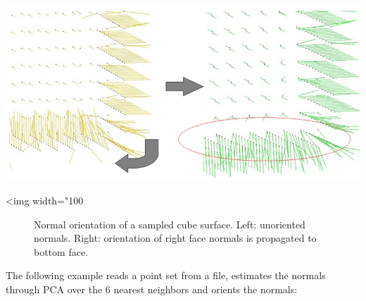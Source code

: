 \begin{center}
    \begin{ccTexOnly}
        \includegraphics[width=1.0\textwidth]{Point_set_processing_3/mst_orient_normals} %
    \end{ccTexOnly}
    \begin{ccHtmlOnly}
        <img width="100%
    \end{ccHtmlOnly}
    \begin{figure}[h]
        \caption{Normal orientation of a sampled cube surface.
                 Left: unoriented normals.
                 Right: orientation of right face normals is propagated to bottom face.}
        \label{Point_set_processing_3-fig-mst_orient_normals}
    \end{figure}
\end{center}

\ccExample

The following example reads a point set from a file, estimates the normals through PCA over the 6 nearest neighbors and orients the normals:


